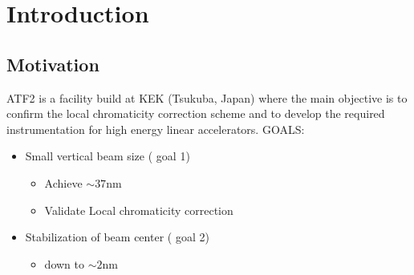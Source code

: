 \chapter{Introduction}
\section{Motivation}
ATF2 is a facility build at KEK (Tsukuba, Japan) where the main objective is to confirm the local chromaticity correction scheme and to develop the required instrumentation for high energy linear accelerators.
GOALS:\par
{\Large
 \begin{itemize}
  \item Small vertical beam size ({\color{red} goal 1})
  \begin{itemize}
   \item Achieve $\sim 37$nm
   \item Validate Local chromaticity correction
  \end{itemize}
  \item Stabilization of beam center ({\color{blue} goal 2})
  \begin{itemize}
   \item down to $\sim2$nm
  \end{itemize}
 \end{itemize}
}
